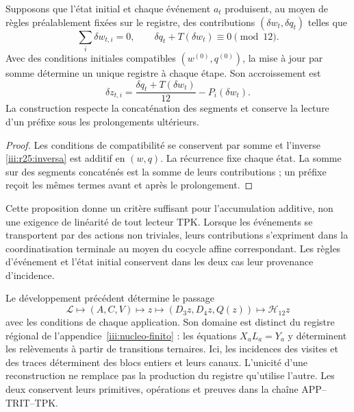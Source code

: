 \begin{proposition}
\label{iii:r25:eventos}
Supposons que l’état initial et chaque événement $a_t$ produisent,
au moyen de règles préalablement fixées sur le registre, des contributions
$(\delta w_t,\delta q_t)$ telles que
\[
 \sum_i\delta w_{t,i}=0,
 \qquad \delta q_t+T(\delta w_t)\equiv0\pmod {12}.
\]
Avec des conditions initiales compatibles $(w^{(0)},q^{(0)})$,
la mise à jour par somme détermine un unique registre à chaque étape.
Son accroissement est
\[
 \delta z_{t,i}=
 \frac{\delta q_t+T(\delta w_t)}{12}-P_i(\delta w_t).
\]
La construction respecte la concaténation des segments et conserve
la lecture d’un préfixe sous les prolongements ultérieurs.
\end{proposition}
\begin{proof}
Les conditions de compatibilité se conservent par somme et
l’inverse \eqref{iii:r25:inversa} est additif en $(w,q)$.
La récurrence fixe chaque état. La somme sur des segments concaténés
est la somme de leurs contributions ; un préfixe reçoit les mêmes
termes avant et après le prolongement.
\end{proof}

Cette proposition donne un critère suffisant pour l’accumulation
additive, non une exigence de linéarité de tout lecteur TPK.
Lorsque les événements se transportent par des actions non triviales, leurs
contributions s’expriment dans la coordinatisation terminale au moyen du cocycle
affine correspondant. Les règles d’événement et l’état initial
conservent dans les deux cas leur provenance d’incidence.

Le développement précédent détermine le passage
\[
 \mathscr L\longmapsto(A,C,V)\longmapsto z
 \longmapsto(D_3z,D_4z,Q(z))\longmapsto\mathcal H_{12}z
\]
avec les conditions de chaque application. Son domaine est distinct du
registre régional de l’appendice~\ref{iii:nucleo-finito} : les
équations $X_aL_a=Y_a$ y déterminent les relèvements à partir de
transitions ternaires. Ici, les incidences des visites et des traces
déterminent des blocs entiers et leurs canaux. L’unicité d’une
reconstruction ne remplace pas la production du registre qu’utilise
l’autre. Les deux conservent leurs primitives, opérations et preuves dans
la chaîne APP--TRIT--TPK.
